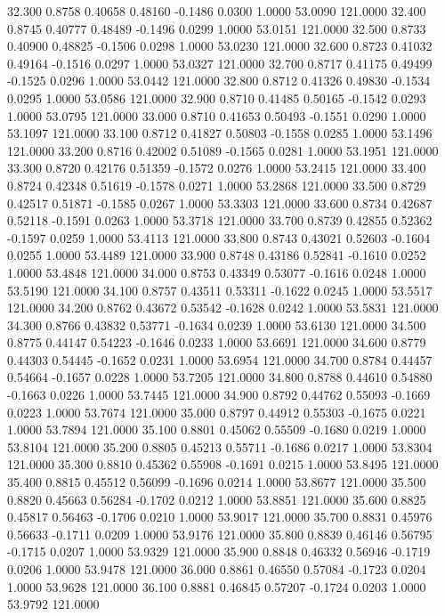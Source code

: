   32.300   0.8758   0.40658   0.48160  -0.1486   0.0300   1.0000  53.0090 121.0000
  32.400   0.8745   0.40777   0.48489  -0.1496   0.0299   1.0000  53.0151 121.0000
  32.500   0.8733   0.40900   0.48825  -0.1506   0.0298   1.0000  53.0230 121.0000
  32.600   0.8723   0.41032   0.49164  -0.1516   0.0297   1.0000  53.0327 121.0000
  32.700   0.8717   0.41175   0.49499  -0.1525   0.0296   1.0000  53.0442 121.0000
  32.800   0.8712   0.41326   0.49830  -0.1534   0.0295   1.0000  53.0586 121.0000
  32.900   0.8710   0.41485   0.50165  -0.1542   0.0293   1.0000  53.0795 121.0000
  33.000   0.8710   0.41653   0.50493  -0.1551   0.0290   1.0000  53.1097 121.0000
  33.100   0.8712   0.41827   0.50803  -0.1558   0.0285   1.0000  53.1496 121.0000
  33.200   0.8716   0.42002   0.51089  -0.1565   0.0281   1.0000  53.1951 121.0000
  33.300   0.8720   0.42176   0.51359  -0.1572   0.0276   1.0000  53.2415 121.0000
  33.400   0.8724   0.42348   0.51619  -0.1578   0.0271   1.0000  53.2868 121.0000
  33.500   0.8729   0.42517   0.51871  -0.1585   0.0267   1.0000  53.3303 121.0000
  33.600   0.8734   0.42687   0.52118  -0.1591   0.0263   1.0000  53.3718 121.0000
  33.700   0.8739   0.42855   0.52362  -0.1597   0.0259   1.0000  53.4113 121.0000
  33.800   0.8743   0.43021   0.52603  -0.1604   0.0255   1.0000  53.4489 121.0000
  33.900   0.8748   0.43186   0.52841  -0.1610   0.0252   1.0000  53.4848 121.0000
  34.000   0.8753   0.43349   0.53077  -0.1616   0.0248   1.0000  53.5190 121.0000
  34.100   0.8757   0.43511   0.53311  -0.1622   0.0245   1.0000  53.5517 121.0000
  34.200   0.8762   0.43672   0.53542  -0.1628   0.0242   1.0000  53.5831 121.0000
  34.300   0.8766   0.43832   0.53771  -0.1634   0.0239   1.0000  53.6130 121.0000
  34.500   0.8775   0.44147   0.54223  -0.1646   0.0233   1.0000  53.6691 121.0000
  34.600   0.8779   0.44303   0.54445  -0.1652   0.0231   1.0000  53.6954 121.0000
  34.700   0.8784   0.44457   0.54664  -0.1657   0.0228   1.0000  53.7205 121.0000
  34.800   0.8788   0.44610   0.54880  -0.1663   0.0226   1.0000  53.7445 121.0000
  34.900   0.8792   0.44762   0.55093  -0.1669   0.0223   1.0000  53.7674 121.0000
  35.000   0.8797   0.44912   0.55303  -0.1675   0.0221   1.0000  53.7894 121.0000
  35.100   0.8801   0.45062   0.55509  -0.1680   0.0219   1.0000  53.8104 121.0000
  35.200   0.8805   0.45213   0.55711  -0.1686   0.0217   1.0000  53.8304 121.0000
  35.300   0.8810   0.45362   0.55908  -0.1691   0.0215   1.0000  53.8495 121.0000
  35.400   0.8815   0.45512   0.56099  -0.1696   0.0214   1.0000  53.8677 121.0000
  35.500   0.8820   0.45663   0.56284  -0.1702   0.0212   1.0000  53.8851 121.0000
  35.600   0.8825   0.45817   0.56463  -0.1706   0.0210   1.0000  53.9017 121.0000
  35.700   0.8831   0.45976   0.56633  -0.1711   0.0209   1.0000  53.9176 121.0000
  35.800   0.8839   0.46146   0.56795  -0.1715   0.0207   1.0000  53.9329 121.0000
  35.900   0.8848   0.46332   0.56946  -0.1719   0.0206   1.0000  53.9478 121.0000
  36.000   0.8861   0.46550   0.57084  -0.1723   0.0204   1.0000  53.9628 121.0000
  36.100   0.8881   0.46845   0.57207  -0.1724   0.0203   1.0000  53.9792 121.0000
